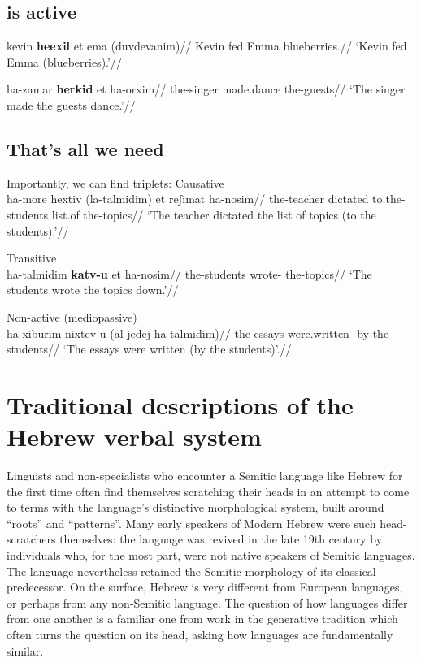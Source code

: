 	\subsection{{\thif} is active}
\pex
	\a \begingl
		\gla kevin \textbf{heexil} et ema (duvdevanim)//
		\glb Kevin fed  Emma blueberries.//
		\glft `Kevin fed Emma (blueberries).'//
	\endgl %
		
	\a \begingl
		\gla ha-zamar \textbf{herkid} et ha-orxim//
		\glb the-singer made.dance  the-guests//
		\glft `The singer made the guests dance.'//
	\endgl
\xe

\newpage
	\subsection{That's all we need}
\pex Importantly, we can find triplets:
	\a Causative {\thif}\\
		\begingl
		\gla ha-more hextiv (la-talmidim) et reʃimat ha-nosim//
		\glb the-teacher dictated to.the-students  list.of the-topics//
		\glft `The teacher dictated the list of topics (to the students).'//
	\endgl
	
	\a Transitive {\tkal}\\
		\begingl
		\gla ha-talmidim \textbf{katv-u} et ha-nosim//
		\glb the-students wrote-  the-topics//
		\glft `The students wrote the topics down.'//
	\endgl
	
	\a Non-active (mediopassive) {\tnif}\\
		\begingl
		\gla ha-xiburim nixtev-u (al-jedej ha-talmidim)//
		\glb the-essays were.written- by the-students//
		\glft `The essays were written (by the students)'.//
	\endgl
\xe



\section{Traditional descriptions of the Hebrew verbal system} \label{sec:tradition}
Linguists and non-specialists who encounter a Semitic language like Hebrew for the first time often find themselves scratching their heads in an attempt to come to terms with the language's distinctive morphological system, built around ``roots'' and ``patterns''. Many early speakers of Modern Hebrew were such head-scratchers themselves: the language was revived in the late 19th century by individuals who, for the most part, were not native speakers of Semitic languages. The language nevertheless retained the Semitic morphology of its classical predecessor. On the surface, Hebrew is very different from European languages, or perhaps from any non-Semitic language. The question of how languages differ from one another is a familiar one from work in the generative tradition which often turns the question on its head, asking how languages are fundamentally similar.

